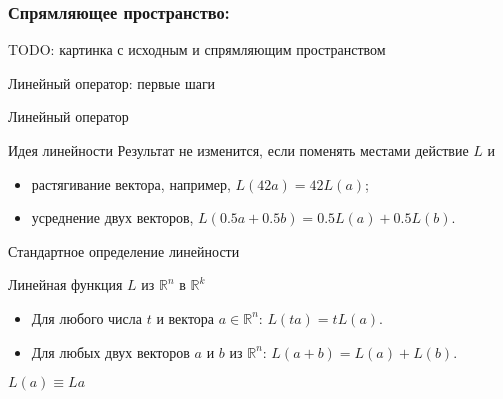 \documentclass[14pt,xcolor=dvipsnames]{beamer}
\newcommand\R{\mathbb{R}}
\begin{document}
\begin{frame}
  \frametitle{Спрямляющее пространство:}

\begin{block}{TODO: картинка с исходным и спрямляющим пространством} 
  
\end{block}
  

\end{frame}


\begin{frame}
  
  Линейный оператор: первые шаги

\end{frame}


\begin{frame}{Линейный оператор}


\begin{block}{Идея линейности}
  Результат не изменится, если поменять местами действие $L$ и
  \begin{itemize}
    \item растягивание вектора, например, $L(42a)=42L(a)$;
    \item усреднение двух векторов, $L(0.5a+0.5b)=0.5L(a) + 0.5L(b)$.
  \end{itemize}
\end{block}

\end{frame}


\begin{frame}{Стандартное определение линейности}

\begin{block}{Линейная функция $L$ из $\R^n$ в $\R^k$}
\begin{itemize}
  \item Для любого числа $t$ и вектора $a \in \R^n$: $L(t a) = tL(a)$.
  \item Для любых двух векторов $a$ и $b$ из $\R^n$: $L(a + b) = L(a) + L(b)$.
\end{itemize}
\end{block}

\begin{block}{$L(a) \equiv La$}
\end{block}

\end{frame}
\end{document}
